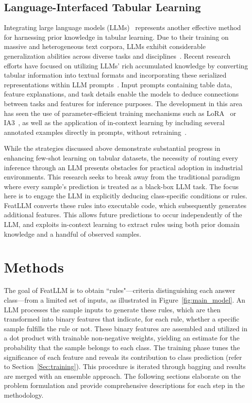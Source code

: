 \subsection{Language-Interfaced Tabular Learning} Integrating large language models (LLMs)~\cite{anil2023palm,openai2023gpt4} represents another effective method for harnessing prior knowledge in tabular learning. Due to their training on massive and heterogeneous text corpora, LLMs exhibit considerable generalization abilities across diverse tasks and disciplines~\cite{brown2020language}. Recent research efforts have focused on utilizing LLMs' rich accumulated knowledge by converting tabular information into textual formats and incorporating these serialized representations within LLM prompts~\cite{dinh2022lift,hegselmann2023tabllm,wang2023anypredict}. Input prompts containing table data, feature explanations, and task details enable the models to deduce connections between tasks and features for inference purposes. The development in this area has seen the use of parameter-efficient training mechanisms such as LoRA~\cite{hu2021lora} or IA3~\cite{liu2022few}, as well as the application of in-context learning by including several annotated examples directly in prompts, without retraining~\cite{dinh2022lift,hegselmann2023tabllm,nam2023semi,slack2023tablet}.

While the strategies discussed above demonstrate substantial progress in enhancing few-shot learning on tabular datasets, the necessity of routing every inference through an LLM presents obstacles for practical adoption in industrial environments. This research seeks to break away from the traditional paradigm where every sample’s prediction is treated as a black-box LLM task. The focus here is to engage the LLM in explicitly deducing class-specific conditions or rules. \textsf{FeatLLM} converts these rules into executable code, which subsequently generates additional features. This allows future predictions to occur independently of the LLM, and exploits in-context learning to extract rules using both prior domain knowledge and a handful of observed samples.

\section{Methods}
The goal of \textsf{FeatLLM} is to obtain ``rules"—criteria distinguishing each answer class—from a limited set of inputs, as illustrated in Figure~\ref{fig:main_model}. An LLM processes the sample inputs to generate these rules, which are then transformed into binary features that indicate, for each rule, whether a specific sample fulfills the rule or not. These binary features are assembled and utilized in a dot product with trainable non-negative weights, yielding an estimate for the probability that the sample belongs to each class. The training phase tunes the significance of each feature and reveals its contribution to class prediction (refer to Section~\ref{Sec:training}). This procedure is iterated through bagging and results are merged with an ensemble approach. The following sections elaborate on the problem formulation and provide comprehensive descriptions for each step in the methodology.

